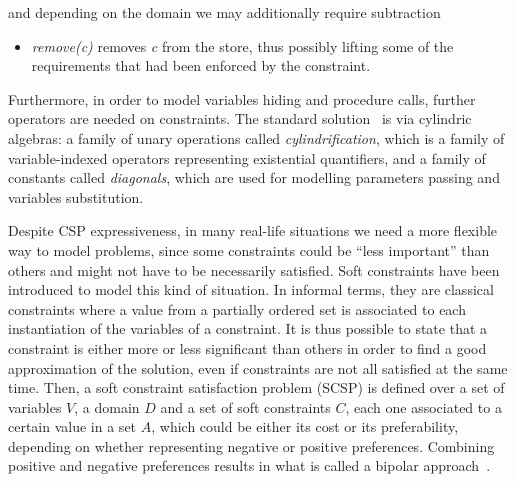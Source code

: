 \documentclass{llncs}
\begin{document}
\noindent
and depending on the domain we may additionally require subtraction

\begin{itemize}
	\item \emph{remove(c)} removes \emph{c} from the store, thus possibly lifting some of the requirements that had been enforced by the constraint. 
\end{itemize}

%

%
Furthermore, in order to model variables hiding and procedure calls, further operators are needed on constraints. 
%
The standard solution~\cite{popl91} is via cylindric algebras: a family of unary operations called \emph{cylindrification}, 
which is a family of variable-indexed operators representing existential quantifiers, and a family of constants called \emph{diagonals}, 
which are used for modelling parameters passing and variables substitution.

\smallskip
Despite CSP expressiveness,  
in many real-life situations we need a more flexible way to model problems, 
since some constraints could be ``less important'' than others and might not have to be necessarily satisfied.
%
Soft constraints have been introduced to model this kind of situation. In informal terms, they are classical constraints where a value from a partially ordered set is associated to each instantiation of the variables of a constraint. It is  thus possible to state that a constraint is either  more or less significant than others in order to find a good approximation of the solution, even if constraints are not all satisfied at the same time. 
%
Then, a soft constraint satisfaction problem (SCSP) is defined over a set of variables $V$, a domain $D$ and a set of soft constraints $C$, each one associated to a certain value in a set $A$, which could be either its cost or its preferability, depending on whether representing negative or positive preferences. Combining positive and negative preferences results in what is called a bipolar approach~\cite{posneg}.
\end{document}
